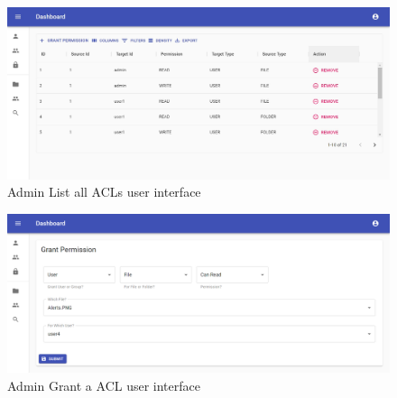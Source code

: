 \begin{figure}[H]
    \centering
    \includegraphics[width=1.0\textwidth]{images/Admin-Acl-List-All.jpg}
    \caption{Admin List all ACLs user interface}
    \label{fig:AdminListAllACLs}
\end{figure}
\begin{figure}[H]
    \centering
    \includegraphics[width=1.0\textwidth]{images/Admin-Grant-Permission.png}
    \caption{Admin Grant a ACL user interface}
    \label{fig:AdminGrantACL}
\end{figure}

